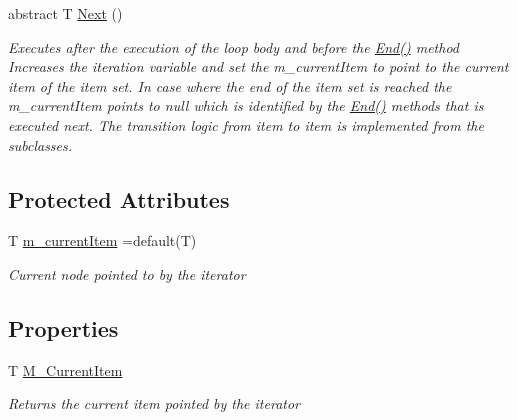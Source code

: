 \begin{DoxyCompactItemize}
abstract T \hyperlink{class_graph_library_1_1_abstract_graph_iterator_a93e91fb82d0db03016fb1aef9231365e}{Next} ()
\begin{DoxyCompactList}\small\item\em Executes after the execution of the loop body and before the \hyperlink{class_graph_library_1_1_abstract_graph_iterator_a77e657620d4949f79970ce536e0d2bde}{End()} method Increases the iteration variable and set the m\+\_\+current\+Item to point to the current item of the item set. In case where the end of the item set is reached the m\+\_\+current\+Item points to null which is identified by the \hyperlink{class_graph_library_1_1_abstract_graph_iterator_a77e657620d4949f79970ce536e0d2bde}{End()} methods that is executed next. The transition logic from item to item is implemented from the subclasses. \end{DoxyCompactList}\end{DoxyCompactItemize}
\subsection*{Protected Attributes}
\begin{DoxyCompactItemize}
\item 
T \hyperlink{class_graph_library_1_1_abstract_graph_iterator_a147d69602d7366f2a22b97243382141b}{m\+\_\+current\+Item} =default(T)
\begin{DoxyCompactList}\small\item\em Current node pointed to by the iterator \end{DoxyCompactList}\end{DoxyCompactItemize}
\subsection*{Properties}
\begin{DoxyCompactItemize}
\item 
T \hyperlink{class_graph_library_1_1_abstract_graph_iterator_ac5ae9844333f785e03b34ee18e59096a}{M\+\_\+\+Current\+Item}
\begin{DoxyCompactList}\small\item\em Returns the current item pointed by the iterator \end{DoxyCompactList}\end{DoxyCompactItemize}


